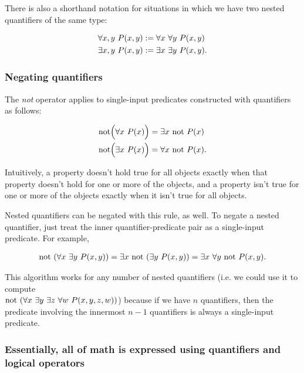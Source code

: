 There is also a shorthand notation for situations in which we have two nested quantifiers of the same type:

\begin{align*}
    &\forall x, y \text{ } P(x, y) := \forall x \text{ } \forall y \text{ } P(x, y) \\
    &\exists x, y \text{ } P(x, y) := \exists x \text{ } \exists y \text{ } P(x, y).
\end{align*}

\subsubsection{Negating quantifiers}

The \textit{not} operator applies to single-input predicates constructed with quantifiers as follows:

\begin{align*}
    \text{not}\Big( \forall x \text{ } P(x) \Big) &= \exists x \text{ } \text{not } P(x) \\
    \text{not}\Big( \exists x \text{ } P(x) \Big) &= \forall x \text{ } \text{not } P(x).
\end{align*}

Intuitively, a property doesn't hold true for all objects exactly when that property doesn't hold for one or more of the objects, and a property isn't true for one or more of the objects exactly when it isn't true for all objects.

Nested quantifiers can be negated with this rule, as well. To negate a nested quantifier, just treat the inner quantifier-predicate pair as a single-input predicate. For example,

\begin{align*}
    \text{not }(\forall x \text{ } \exists y \text{ } P(x, y)) = \exists x \text{ } \text{not } (\exists y \text{ } P(x, y)) = \exists x \text{ } \forall y \text{ } \text{not } P(x, y).
\end{align*}

This algorithm works for any number of nested quantifiers (i.e. we could use it to compute \\ $\text{not }(\forall x \text{ } \exists y \text{ } \exists z \text{ } \forall w \text{ } P(x, y, z, w))$) because if we have $n$ quantifiers, then the predicate involving the innermost $n - 1$ quantifiers is always a single-input predicate.

\subsubsection{Essentially, all of math is expressed using quantifiers and logical operators}

